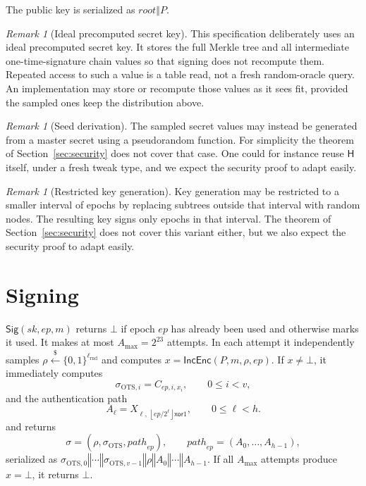 \documentclass[11pt]{article}
\theoremstyle{definition}
\theoremstyle{plain}
\theoremstyle{remark}
\newtheorem{remark}[definition]{Remark}
\newcommand{\bits}[1]{\{0,1\}^{#1}}
\newcommand{\getsr}{\stackrel{\$}{\gets}}
\newcommand{\IncEnc}{\mathsf{IncEnc}}
\newcommand{\Sig}{\mathsf{Sig}}
\newcommand{\hash}{\mathsf{H}}
\newcommand{\concat}{\mathbin\Vert}
\newcommand{\ep}{\mathit{ep}}
\newcommand{\sk}{\mathit{sk}}
\newcommand{\rootnode}{\mathit{root}}
\newcommand{\lrnd}{\ell_{\mathrm{rnd}}}
\newcommand{\amax}{A_{\max}}
\begin{document}
The public key is serialized as $\rootnode\concat P$.

\begin{remark}[Ideal precomputed secret key]
This specification deliberately uses an ideal precomputed secret key. It stores the full Merkle tree and all intermediate one-time-signature chain values so that signing does not recompute them. Repeated access to such a value is a table read, not a fresh random-oracle query. An implementation may store or recompute those values as it sees fit, provided the sampled ones keep the distribution above.
\end{remark}

\begin{remark}[Seed derivation]
The sampled secret values may instead be generated from a master secret using a pseudorandom function. For simplicity the theorem of Section~\ref{sec:security} does not cover that case. One could for instance reuse $\hash$ itself, under a fresh tweak type, and we expect the security proof to adapt easily.
\end{remark}

\begin{remark}[Restricted key generation]
Key generation may be restricted to a smaller interval of epochs by replacing subtrees outside that interval with random nodes. The resulting key signs only epochs in that interval. The theorem of Section~\ref{sec:security} does not cover this variant either, but we also expect the security proof to adapt easily.
\end{remark}

\section{Signing}

$\Sig(\sk,\ep,m)$ returns $\bot$ if epoch $\ep$ has already been used and otherwise marks it used. It makes at most $\amax=2^{23}$ attempts. In each attempt it independently samples $\rho\getsr\bits{\lrnd}$ and computes $x=\IncEnc(P,m,\rho,\ep)$. If $x\neq\bot$, it immediately computes
\[
  \sigma_{\mathrm{OTS},i}=C_{\ep,i,x_i},
  \qquad 0\leq i<v,
\]
and the authentication path
\[
  A_\ell=X_{\ell,\,\left\lfloor\ep/2^\ell\right\rfloor\mathbin{\mathsf{xor}}1},
  \qquad 0\leq\ell<h.
\]
and returns
\[
  \sigma=(\rho,\sigma_{\mathrm{OTS}},\mathit{path}_{\ep}),
  \qquad
  \mathit{path}_{\ep}=(A_0,\ldots,A_{h-1}),
\]
serialized as $\sigma_{\mathrm{OTS},0}\concat\cdots\concat\sigma_{\mathrm{OTS},v-1}\concat\rho\concat A_0\concat\cdots\concat A_{h-1}$. If all $\amax$ attempts produce $x=\bot$, it returns $\bot$.
\end{document}
